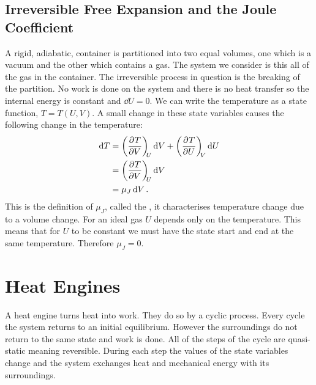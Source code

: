 \documentclass[a4paper]{article}
\begin{document}
    \subsection{Irreversible Free Expansion and the Joule Coefficient}\label{sec:irreversible free expansion and the Joule coefficient}
    A rigid, adiabatic, container is partitioned into two equal volumes, one which is a vacuum and the other which contains a gas.
    The system we consider is this all of the gas in the container.
    The irreversible process in question is the breaking of the partition.
    No work is done on the system and there is no heat transfer so the internal energy is constant and \(\dd{U} = 0\).
    We can write the temperature as a state function, \(T = T(U, V)\).
    A small change in these state variables causes the following change in the temperature:
    \begin{align*}
        \dd{T} &= \left(\pdv[]{T}{V}\right)_{\!\!{U}}\dd{V} + \left(\pdv[]{T}{U}\right)_{\!\!{V}}\dd{U}\\
        &= \left(\pdv[]{T}{V}\right)_{\!\!{U}}\dd{V}\\
        &= \mu_J\dd{V}.
    \end{align*}
    This is the definition of \(\mu_J\), called the , it characterises temperature change due to a volume change.
    For an ideal gas \(U\) depends only on the temperature.
    This means that for \(U\) to be constant we must have the state start and end at the same temperature.
    Therefore \(\mu_J = 0\).
    
    \section{Heat Engines}
    A heat engine turns heat into work.
    They do so by a cyclic process.
    Every cycle the system returns to an initial equilibrium.
    However the surroundings do not return to the same state and work is done.
    All of the steps of the cycle are quasi-static meaning reversible.
    During each step the values of the state variables change and the system exchanges heat and mechanical energy with its surroundings.
    
\end{document}
